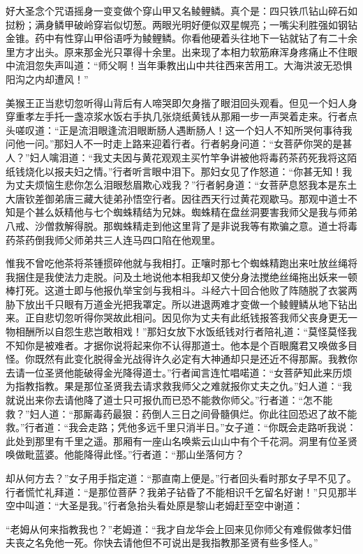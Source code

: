 \documentclass[12pt,UTF8]{ctexbook}
\begin{document}
好大圣念个咒语摇身一变变做个穿山甲又名鲮鲤鳞。真个是：四只铁爪钻山碎石如挝粉；满身鳞甲破岭穿岩似切葱。两眼光明好便似双星幌亮；一嘴尖利胜强如钢钻金锥。药中有性穿山甲俗语呼为鲮鲤鳞。你看他硬着头往地下一钻就钻了有二十余里方才出头。原来那金光只罩得十余里。出来现了本相力软筋麻浑身疼痛止不住眼中流泪忽失声叫道：“师父啊！当年秉教出山中共往西来苦用工。大海洪波无恐惧阳沟之内却遭风！”

美猴王正当悲切忽听得山背后有人啼哭即欠身揩了眼泪回头观看。但见一个妇人身穿重孝左手托一盏凉浆水饭右手执几张烧纸黄钱从那厢一步一声哭着走来。行者点头嗟叹道：“正是流泪眼逢流泪眼断肠人遇断肠人！这一个妇人不知所哭何事待我问他一问。”那妇人不一时走上路来迎着行者。行者躬身问道：“女菩萨你哭的是甚人？”妇人噙泪道：“我丈夫因与黄花观观主买竹竿争讲被他将毒药茶药死我将这陌纸钱烧化以报夫妇之情。”行者听言眼中泪下。那妇女见了作怒道：“你甚无知！我为丈夫烦恼生悲你怎么泪眼愁眉欺心戏我？”行者躬身道：“女菩萨息怒我本是东土大唐钦差御弟唐三藏大徒弟孙悟空行者。因往西天行过黄花观歇马。那观中道士不知是个甚么妖精他与七个蜘蛛精结为兄妹。蜘蛛精在盘丝洞要害我师父是我与师弟八戒、沙僧救解得脱。那蜘蛛精走到他这里背了是非说我等有欺骗之意。道士将毒药茶药倒我师父师弟共三人连马四口陷在他观里。

惟我不曾吃他茶将茶锺掼碎他就与我相打。正嚷时那七个蜘蛛精跑出来吐放丝绳将我捆住是我使法力走脱。问及土地说他本相我却又使分身法搅绝丝绳拖出妖来一顿棒打死。这道士即与他报仇举宝剑与我相斗。斗经六十回合他败了阵随脱了衣裳两胁下放出千只眼有万道金光把我罩定。所以进退两难才变做一个鲮鲤鳞从地下钻出来。正自悲切忽听得你哭故此相问。因见你为丈夫有此纸钱报答我师父丧身更无一物相酬所以自怨生悲岂敢相戏！”那妇女放下水饭纸钱对行者陪礼道：“莫怪莫怪我不知你是被难者。才据你说将起来你不认得那道士。他本是个百眼魔君又唤做多目怪。你既然有此变化脱得金光战得许久必定有大神通却只是还近不得那厮。我教你去请一位圣贤他能破得金光降得道士。”行者闻言连忙唱喏道：“女菩萨知此来历烦为指教指教。果是那位圣贤我去请求救我师父之难就报你丈夫之仇。”妇人道：“我就说出来你去请他降了道士只可报仇而已恐不能救你师父。”行者道：“怎不能救？”妇人道：“那厮毒药最狠：药倒人三日之间骨髓俱烂。你此往回恐迟了故不能救。”行者道：“我会走路；凭他多远千里只消半日。”女子道：“你既会走路听我说：此处到那里有千里之遥。那厢有一座山名唤紫云山山中有个千花洞。洞里有位圣贤唤做毗蓝婆。他能降得此怪。”行者道：“那山坐落何方？

却从何方去？”女子用手指定道：“那直南上便是。”行者回头看时那女子早不见了。行者慌忙礼拜道：“是那位菩萨？我弟子钻昏了不能相识千乞留名好谢！”只见那半空中叫道：“大圣是我。”行者急抬头看处原是黎山老姆赶至空中谢道：

“老姆从何来指教我也？”老姆道：“我才自龙华会上回来见你师父有难假做孝妇借夫丧之名免他一死。你快去请他但不可说出是我指教那圣贤有些多怪人。”
\end{document}
